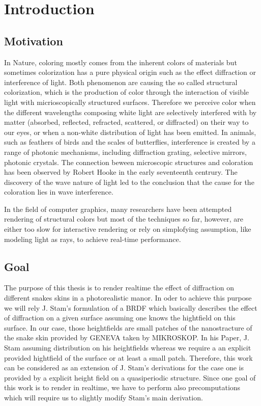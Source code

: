 \section{Introduction}
\subsection{Motivation}
In Nature, coloring mostly comes from the inherent colors of materials but sometimes colorization has a pure physical origin such as the effect diffraction or interference of light. Both phenomenon are causing the so called structural colorization, which is the production of color through the interaction of visible light with micrioscopically structured surfaces. 
Therefore we perceive color when the different wavelengths composing white light are selectively interfered with by matter (absorbed, reflected, refracted, scattered, or diffracted) on their way to our eyes, or when a non-white distribution of light has been emitted.
In animals, such as feathers of birds and the scales of butterflies, interference is created by a range of photonic mechanisms, including diffraction grating, selective mirrors, photonic crystals.
The connection beween microscopic structures and coloration has been observed by Robert Hooke in the early seventeenth centrury. The discovery of the wave nature of light led to the conclusion that the cause for the coloration lies in wave interference.

In the field of computer graphics, many researchers have been attempted rendering of structural colors but most of the techniques so far, however, are either too slow for interactive rendering or rely on simplofying assumption, like modeling light as rays, to achieve real-time performance.

\subsection{Goal}
The purpose of this thesis is to render realtime the effect of diffraction on different snakes skins in a photorealistic manor. In oder to achieve this purpose we will rely J. Stam's formulation of a BRDF which basically describes the effect of diffraction on a given surface assuming one knows the hightfield on this surface.
In our case, those heightfields are small patches of the nanostracture of the snake skin provided by GENEVA taken by MIKROSKOP.
In his Paper, J. Stam assuming distribution on his heightfields whereas we require a an explicit provided hightfield of the surface or at least a small patch. Therefore, this work can be considered as an extension of J. Stam's derivations for the case one is provided by a explicit height field on a quasiperiodic structure.
Since one goal of this work is to render in realtime, we have to perform also precomputations which will require us to slightly modify Stam's main derivation.



